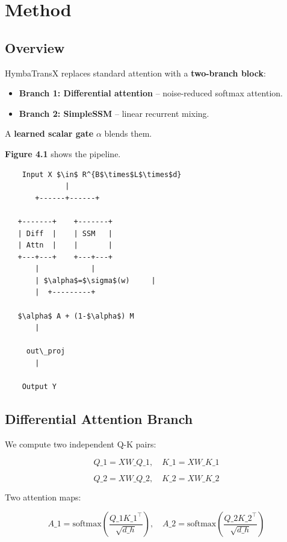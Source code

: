 \section{Method}

\subsection{Overview}

HymbaTransX replaces standard attention with a \textbf{two-branch block}:

\begin{itemize}
\item \textbf{Branch 1: Differential attention} -- noise-reduced softmax attention.
\item \textbf{Branch 2: SimpleSSM} -- linear recurrent mixing.

\end{itemize}
A \textbf{learned scalar gate} $\alpha$ blends them.

\textbf{Figure 4.1} shows the pipeline.

\begin{lstlisting}
    Input X $\in$ R^{B$\times$L$\times$d}
              |
       +------+------+
                      
   +-------+    +-------+
   | Diff  |    | SSM   |
   | Attn  |    |       |
   +---+---+    +---+---+
       |            |
       | $\alpha$=$\sigma$(w)     |
       |  +---------+
           
   $\alpha$ A + (1-$\alpha$) M
       |
        
     out\_proj
       |
        
    Output Y
\end{lstlisting}

\subsection{Differential Attention Branch}

We compute two independent Q-K pairs:

\[
Q\_1 = X W\_{Q\_1}, \quad K\_1 = X W\_{K\_1}
\tag{4.1}
\]

\[
Q\_2 = X W\_{Q\_2}, \quad K\_2 = X W\_{K\_2}
\tag{4.2}
\]

Two attention maps:

\[
A\_1 = \text{softmax}\!\left(\frac{Q\_1 K\_1^\top}{\sqrt{d\_h}}\right), \quad
A\_2 = \text{softmax}\!\left(\frac{Q\_2 K\_2^\top}{\sqrt{d\_h}}\right)
\tag{4.3}
\]

